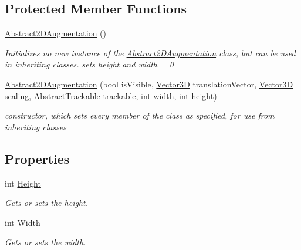 \subsection*{Protected Member Functions}
\begin{DoxyCompactItemize}
\item 
\hyperlink{class_a_rdev_kit_1_1_model_1_1_project_1_1_abstract2_d_augmentation_adfb4e825f67880c9ec8790a51a60b574}{Abstract2\-D\-Augmentation} ()
\begin{DoxyCompactList}\small\item\em Initializes no new instance of the \hyperlink{class_a_rdev_kit_1_1_model_1_1_project_1_1_abstract2_d_augmentation}{Abstract2\-D\-Augmentation} class, but can be used in inheriting classes. sets height and width = 0 \end{DoxyCompactList}\item 
\hyperlink{class_a_rdev_kit_1_1_model_1_1_project_1_1_abstract2_d_augmentation_a36b71862a4466a4d1942e83e2341cc88}{Abstract2\-D\-Augmentation} (bool is\-Visible, \hyperlink{class_a_rdev_kit_1_1_model_1_1_project_1_1_vector3_d}{Vector3\-D} translation\-Vector, \hyperlink{class_a_rdev_kit_1_1_model_1_1_project_1_1_vector3_d}{Vector3\-D} scaling, \hyperlink{class_a_rdev_kit_1_1_model_1_1_project_1_1_abstract_trackable}{Abstract\-Trackable} \hyperlink{class_a_rdev_kit_1_1_model_1_1_project_1_1_abstract_augmentation_a8d8e3f3c42696008edbfc44d51ba518d}{trackable}, int width, int height)
\begin{DoxyCompactList}\small\item\em constructor, which sets every member of the class as specified, for use from inheriting classes \end{DoxyCompactList}\end{DoxyCompactItemize}
\subsection*{Properties}
\begin{DoxyCompactItemize}
\item 
int \hyperlink{class_a_rdev_kit_1_1_model_1_1_project_1_1_abstract2_d_augmentation_a14d016654e3824108d413c812f134539}{Height}
\begin{DoxyCompactList}\small\item\em Gets or sets the height. \end{DoxyCompactList}\item 
int \hyperlink{class_a_rdev_kit_1_1_model_1_1_project_1_1_abstract2_d_augmentation_abbc74c285b3d91be5841ce16473e2cd6}{Width}
\begin{DoxyCompactList}\small\item\em Gets or sets the width. \end{DoxyCompactList}\end{DoxyCompactItemize}
